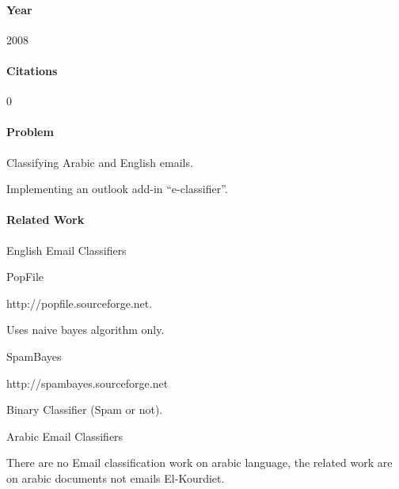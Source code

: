 \documentclass[12pt]{article}
\newenvironment{my_itemize}
{\begin{itemize}
  \setlength{\itemsep}{0cm}
  \setlength{\parskip}{0cm}}
{\end{itemize}}
\begin{document}
\paragraph{Year} 2008
\paragraph{Citations} 0

\paragraph{Problem}
\begin{my_itemize}
    \item Classifying Arabic and English emails.
    \item Implementing an outlook add-in ``e-classifier''.
\end{my_itemize}

\paragraph{Related Work}
\begin{my_itemize}
    \item English Email Classifiers
    \begin{my_itemize}
        \item PopFile
        \begin{my_itemize}
            \item http://popfile.sourceforge.net.
            \item Uses naive bayes algorithm only.
        \end{my_itemize}
        \item SpamBayes
        \begin{my_itemize}
            \item http://spambayes.sourceforge.net
            \item Binary Classifier (Spam or not).
        \end{my_itemize}
    \end{my_itemize}
    \item Arabic Email Classifiers
    \begin{my_itemize}
    \item There are no Email classification work on arabic language, the
	  related work are on arabic documents not emails El-Kourdiet.
    \end{my_itemize}
\end{my_itemize}
\end{document}
